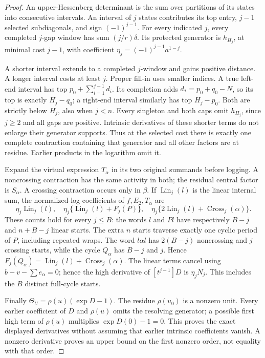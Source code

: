 \documentclass[11pt,a4paper]{amsart}
\numberwithin{equation}{section}
\theoremstyle{plain}
\theoremstyle{definition}
\begin{document}
\begin{proof}
An upper-Hessenberg determinant is the sum over partitions of its states into consecutive intervals.  An interval of \(j\) states contributes its top entry, \(j-1\) selected subdiagonals, and sign \((-1)^{j-1}\).  For every indicated \(j\), every completed \(j\)-gap window has sum \((j/r)\delta\).  Its protected generator is \(h_{H_j}\), at minimal cost \(j-1\), with coefficient \(\eta_j=(-1)^{j-1}a^{1-j}\).

A shorter interval extends to a completed \(j\)-window and gains positive distance.  A longer interval costs at least \(j\).  Proper fill-in uses smaller indices.  A true left-end interval has top \(p_0+\sum_{i=1}^{j-1}d_i\).  Its completion adds \(d_*=p_0+q_0-N\), so its top is exactly \(H_j-q_0\); a right-end interval similarly has top \(H_j-p_0\).  Both are strictly below \(H_j\), also when \(j<n\).  Every singleton and both caps omit \(h_{H_j}\), since \(j\ge2\) and all gaps are positive.  Intrinsic derivatives of these shorter terms do not enlarge their generator supports.  Thus at the selected cost there is exactly one complete contraction containing that generator and all other factors are at residue.  Earlier products in the logarithm omit it.

Expand the virtual expression \(T_\alpha\) in its two original summands before logging.  A noncrossing contraction has the same activity in both; the residual central factor is \(S_\alpha\).  A crossing contraction occurs only in \(\beta\).  If \(\operatorname{Lin}_j(l)\) is the linear internal sum, the normalized-log coefficients of \(f,E_2,T_\alpha\) are
\[
 \eta_j\operatorname{Lin}_j(l),\quad
 \eta_j\{\operatorname{Lin}_j(l)+F_j(P)\},\quad
 \eta_j\{2\operatorname{Lin}_j(l)+\operatorname{Cross}_j(\alpha)\}.
\]
These counts hold for every \(j\le B\): the words \(l\) and \(Pl\) have respectively \(B-j\) and \(n+B-j\) linear starts.  The extra \(n\) starts traverse exactly one cyclic period of \(P\), including repeated wraps.  The word \(l\alpha l\) has \(2(B-j)\) noncrossing and \(j\) crossing starts, while the cycle \(Q_\alpha\) has \(B-j\) and \(j\).  Hence \(F_j(Q_\alpha)=\operatorname{Lin}_j(l)+\operatorname{Cross}_j(\alpha)\).  The linear terms cancel using \(b-v-\sum e_\alpha=0\); hence the high derivative of \([t^{j-1}]D\) is \(\eta_jN_j\).  This includes the \(B\) distinct full-cycle starts.

Finally \(\Theta_U=\rho(u)(\exp D-1)\).  The residue \(\rho(u_0)\) is a nonzero unit.  Every earlier coefficient of \(D\) and \(\rho(u)\) omits the resolving generator; a possible first high term of \(\rho(u)\) multiplies \(\exp D(0)-1=0\).  This proves the exact displayed derivatives without assuming that earlier intrinsic coefficients vanish.  A nonzero derivative proves an upper bound on the first nonzero order, not equality with that order.
\end{proof}
\end{document}
